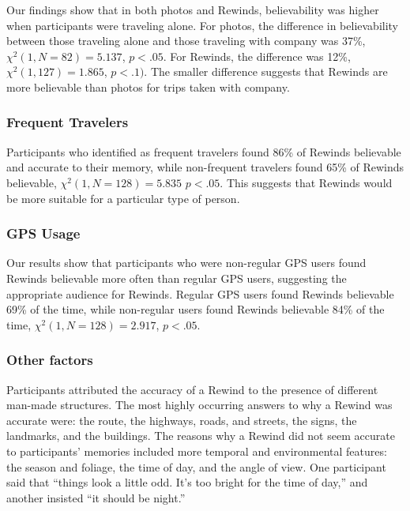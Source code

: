 \documentclass{sigchi}
\begin{document}

Our findings show that in both photos and Rewinds, believability was higher when participants were traveling alone. For photos, the difference in believability between those traveling alone and those traveling with company was 37\%, $\chi^2(1, N=82) = 5.137$, $p <.05$. For Rewinds, the difference was 12\%, $\chi^2(1, 127) = 1.865$, $p <.1)$. The smaller difference suggests that Rewinds are more believable than photos for trips taken with company.

\subsubsection{Frequent Travelers}
Participants who identified as frequent travelers found 86\% of Rewinds believable and accurate to their memory, while non-frequent travelers found 65\% of Rewinds believable, $\chi^2(1, N=128) = 5.835$
$p < .05$. This suggests that Rewinds would be more suitable for a particular type of person.

\subsubsection{GPS Usage}
Our results show that participants who were non-regular GPS users found Rewinds believable more often than regular GPS users, suggesting the appropriate audience for Rewinds. Regular GPS users found Rewinds believable 69\% of the time, while non-regular users found Rewinds believable 84\% of the time, $\chi^2(1, N=128) = 2.917$, $p < .05$.

\subsubsection{Other factors}
Participants attributed the accuracy of a Rewind to the presence of different man-made structures. The most highly occurring answers to why a Rewind was accurate were: the route, the highways, roads, and streets, the signs, the landmarks, and the buildings. The reasons why a Rewind did not seem accurate to participants' memories included more temporal and environmental features: the season and foliage, the time of day, and the angle of view. One participant said that ``things look a little odd. It's too bright for the time of day,'' and another insisted ``it should be night.''
\end{document}
